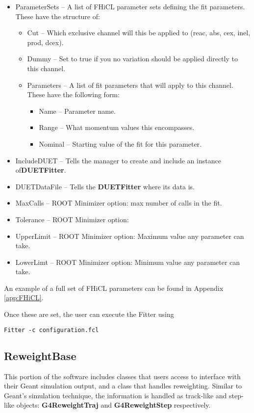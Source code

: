 \documentclass[12pt]{article}
\begin{document}
\begin{itemize}
	\item ParameterSets -- A list of FHiCL parameter sets defining the fit parameters. These have the structure of:
	\begin{itemize}
		\item Cut -- Which exclusive channel will this be applied to (reac, abs, cex, inel, prod, dcex).
		\item Dummy -- Set to true if you no variation should be applied directly to this channel.
		\item Parameters -- A list of fit parameters that will apply to this channel. These have the following form:
		\begin{itemize}
			\item Name -- Parameter name.
			\item Range -- What momentum values this encompasses.
			\item Nominal -- Starting value of the fit for this parameter. 
		\end{itemize}
    \end{itemize}	 
    
    \item IncludeDUET -- Tells the manager to create and include an instance of\textbf{DUETFitter}.
    \item DUETDataFile -- Tells the \textbf{DUETFitter} where its data is.
    \item MaxCalls -- ROOT Minimizer option: max number of calls in the fit.
    \item Tolerance -- ROOT Minimizer option:
    \item UpperLimit -- ROOT Minimizer option: Maximum value any parameter can take.
    \item LowerLimt -- ROOT Minimizer option: Minimum value any parameter can take.
\end{itemize}

An example of a full set of FHiCL parameters can be found in Appendix \ref{app:FHiCL}.

Once these are set, the user can execute the Fitter using

\begin{lstlisting}
Fitter -c configuration.fcl
\end{lstlisting}

\subsection{ReweightBase}\label{ssec:ReweightBase}
This portion of the software includes classes that users access to interface with their Geant  simulation output, and a class that handles reweighting. Similar to Geant's simulation technique, the information is handled as track-like and step-like objects: \textbf{G4ReweightTraj} and \textbf{G4ReweightStep }respectively.
\end{document}

